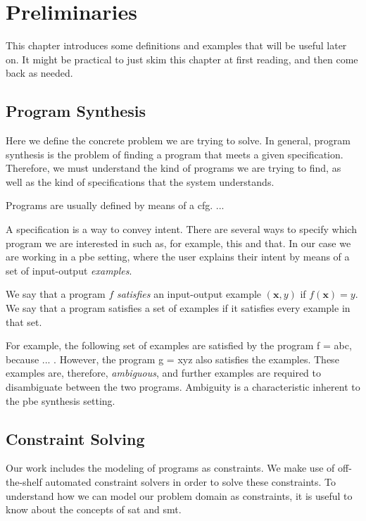 \chapter{Preliminaries}
\label{chapter:preliminaries}

This chapter introduces some definitions and examples that will be useful later
on. It might be practical to just skim this chapter at first reading, and then
come back as needed.

\section{Program Synthesis}
\label{sec:program-synthesis}

Here we define the concrete problem we are trying to solve. In general, program
synthesis is the problem of finding a program that meets a given specification.
Therefore, we must understand the kind of programs we are trying to find, as
well as the kind of specifications that the system understands.

Programs are usually defined by means of a \gls{cfg}. ...

A specification is a way to convey intent. There are several ways to specify
which program we are interested in such as, for example, this and that. In our
case we are working in a \gls{pbe} setting, where the user explains their intent
by means of a set of input-output \textit{examples}.

We say that a program $f$ \textit{satisfies} an input-output example
$(\mathbf{x}, y)$ if $f(\mathbf{x}) = y$. We say that a program satisfies a set
of examples if it satisfies every example in that set.

For example, the following set of examples are satisfied by the program f = abc,
because ... . However, the program g = xyz also satisfies the examples. These
examples are, therefore, \textit{ambiguous}, and further examples are required
to disambiguate between the two programs. Ambiguity is a characteristic inherent
to the \gls{pbe} synthesis setting.

\section{Constraint Solving}
\label{sec:preliminaries-constraint-solving}

Our work includes the modeling of programs as constraints. We make use of
off-the-shelf automated constraint solvers in order to solve these constraints.
To understand how we can model our problem domain as constraints, it is useful
to know about the concepts of \gls{sat} and \gls{smt}.

